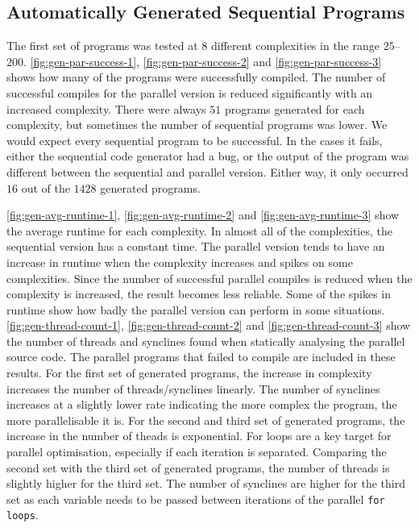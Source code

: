 \subsection{Automatically Generated Sequential Programs}
The first set of programs was tested at $8$ different complexities in the range $25$--$200$.
\autoref{fig:gen-par-success-1}, \autoref{fig:gen-par-success-2} and \autoref{fig:gen-par-success-3} shows how many of the programs were successfully compiled. The number of successful compiles for the parallel version is reduced significantly with an increased complexity. There were always $51$ programs generated for each complexity, but sometimes the number of sequential programs was lower. We would expect every sequential program to be successful. In the cases it fails, either the sequential code generator had a bug, or the output of the program was different between the sequential and parallel version. Either way, it only occurred $16$ out of the $1428$ generated programs.

\autoref{fig:gen-avg-runtime-1}, \autoref{fig:gen-avg-runtime-2} and \autoref{fig:gen-avg-runtime-3} show the average runtime for each complexity. In almost all of the complexities, the sequential version has a constant time. The parallel version tends to have an increase in runtime when the complexity increases and spikes on some complexities. Since the number of successful parallel compiles is reduced when the complexity is increased, the result becomes less reliable. Some of the spikes in runtime show how badly the parallel version can perform in some situations.
\autoref{fig:gen-thread-count-1}, \autoref{fig:gen-thread-count-2} and \autoref{fig:gen-thread-count-3} show the number of threads and synclines found when statically analysing the parallel source code. The parallel programs that failed to compile are included in these results. For the first set of generated programs, the increase in complexity increases the number of threads/synclines linearly. The number of synclines increases at a slightly lower rate indicating the more complex the program, the more parallelisable it is. For the second and third set of generated programs, the increase in the number of theads is exponential. For loops are a key target for parallel optimisation, especially if each iteration is separated. Comparing the second set with the third set of generated programs, the number of threads is slightly higher for the third set.
The number of synclines are higher for the third set as each variable needs to be passed between iterations of the parallel \texttt{for loops}.


